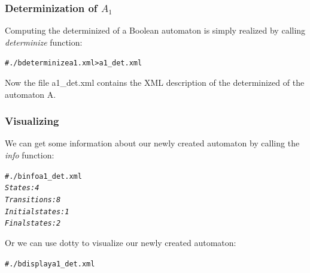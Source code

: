 \subsubsection{Determinization of $A_1$}
Computing the determinized of a Boolean automaton is simply realized
by calling \textit{determinize} function:
\begin{alltt}
# ./b determinize a1.xml > a1\_det.xml
\end{alltt}
Now the file a1\_det.xml contains the XML description of the
determinized of the automaton A.

\subsubsection{Visualizing}

We can get some information about our newly created automaton by calling
the \textit{info} function:
\begin{alltt}
# ./b info a1\_det.xml
\textit{States: 4
Transitions: 8
Initial states: 1
Final states: 2}
\end{alltt}
Or we can use dotty to visualize our newly created automaton:
\begin{alltt}
# ./b display a1\_det.xml
\end{alltt}

\begin{center}
\end{center}

